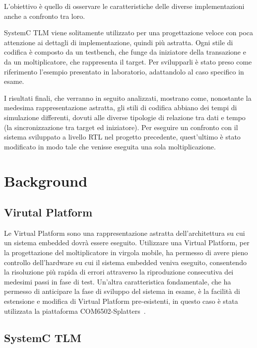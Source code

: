 \documentclass[]{IEEEtran}
\begin{document}
	L'obiettivo \`e quello di osservare le caratteristiche delle diverse implementazioni anche a confronto tra loro.

	SystemC TLM viene solitamente utilizzato per una progettazione veloce con poca attenzione ai dettagli di implementazione, quindi pi\`u astratta. Ogni stile di codifica \`e composto da un testbench, che funge da iniziatore della transazione e da un moltiplicatore, che rappresenta il target. Per svilupparli \`e stato preso come riferimento l'esempio presentato in laboratorio, adattandolo al caso specifico in esame.

	I risultati finali, che verranno in seguito analizzati, mostrano come, nonostante la medesima rappresentazione astratta, gli stili di codifica abbiano dei tempi di simulazione differenti, dovuti alle diverse tipologie di relazione tra dati e tempo (la sincronizzazione tra target ed iniziatore). Per eseguire un confronto con il sistema sviluppato a livello RTL nel progetto precedente, quest'ultimo \`e stato modificato in modo tale che venisse eseguita una sola moltiplicazione.
		
	\section{Background}
	
	\subsection{Virutal Platform}
	
	Le Virtual Platform sono una rappresentazione astratta dell'architettura su cui un sistema embedded dovr\`a essere eseguito. Utilizzare una Virtual Platform, per la progettazione del moltiplicatore in virgola mobile, ha permesso di avere pieno controllo dell'hardware su cui il sistema embedded veniva eseguito, consentendo la risoluzione pi\`u rapida di errori attraverso la riproduzione consecutiva dei medesimi passi in fase di test. Un'altra caratteristica fondamentale, che ha permesso di anticipare la fase di sviluppo del sistema in esame, \`e la facilit\`a di estensione e modifica di Virtual Platform pre-esistenti, in questo caso \`e stata utilizzata la piattaforma COM6502-Splatters~\cite{COM6502-Splatters}.
	
	\subsection{SystemC TLM}
	
\end{document}
